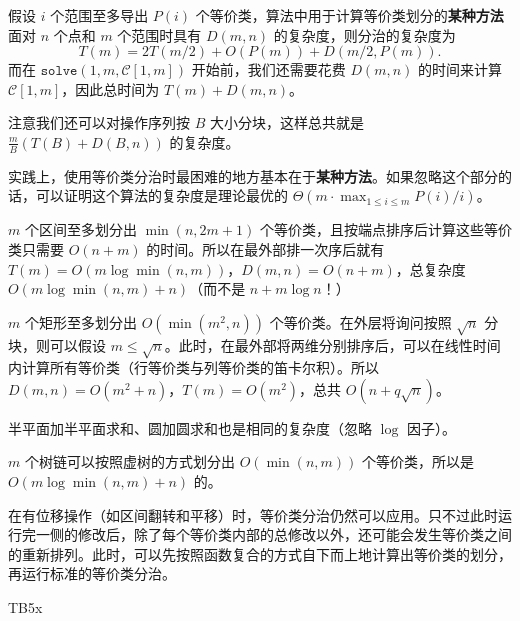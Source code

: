 假设 $i$ 个范围至多导出 $P(i)$ 个等价类，算法中用于计算等价类划分的\textbf{某种方法}面对 $n$ 个点和 $m$ 个范围时具有 $D(m,n)$ 的复杂度，则分治的复杂度为
$$
T(m)=2T(m/2)+O(P(m))+D(m/2,P(m)).
$$
而在 $\mathtt{solve}(1,m,\mathcal C[1,m])$ 开始前，我们还需要花费 $D(m,n)$ 的时间来计算 $\mathcal C[1,m]$，因此总时间为 $T(m)+D(m,n)$。

注意我们还可以对操作序列按 $B$ 大小分块，这样总共就是 $\frac{m}{B}(T(B)+D(B,n))$ 的复杂度。

\begin{remark}
    实践上，使用等价类分治时最困难的地方基本在于\textbf{某种方法}。如果忽略这个部分的话，可以证明这个算法的复杂度是理论最优的 $\Theta(m\cdot \max_{1\le i\le m}P(i)/i)$。
\end{remark}

\begin{example}[常规线段树问题]
    $m$ 个区间至多划分出 $\min(n,2m+1)$ 个等价类，且按端点排序后计算这些等价类只需要 $O(n+m)$ 的时间。所以在最外部排一次序后就有 $T(m)=O(m\log \min(n,m))$，$D(m,n)=O(n+m)$，总复杂度 $O(m\log \min(n,m)+n)$（而不是 $n+m\log n$！）
\end{example}

\begin{example}[矩形加矩形和]
    $m$ 个矩形至多划分出 $O(\min(m^2,n))$ 个等价类。在外层将询问按照 $\sqrt{n}$ 分块，则可以假设 $m\le \sqrt{n}$。此时，在最外部将两维分别排序后，可以在线性时间内计算所有等价类（行等价类与列等价类的笛卡尔积）。所以 $D(m,n)=O(m^2+n)$，$T(m)=O(m^2)$，总共 $O(n+q\sqrt{n})$。
\end{example}
\begin{remark}
    半平面加半平面求和、圆加圆求和也是相同的复杂度（忽略 $\log$ 因子）。
\end{remark}

\begin{example}[树链加树链和]
    $m$ 个树链可以按照虚树的方式划分出 $O(\min(n,m))$ 个等价类，所以是 $O(m\log\min(n,m)+n)$ 的。
\end{example}

在有位移操作（如区间翻转和平移）时，等价类分治仍然可以应用。只不过此时运行完一侧的修改后，除了每个等价类内部的总修改以外，还可能会发生等价类之间的重新排列。此时，可以先按照函数复合的方式自下而上地计算出等价类的划分，再运行标准的等价类分治。

\begin{example}[文艺平衡树]
    
\end{example}

\begin{example}[*P7723]
    TB5x
\end{example}